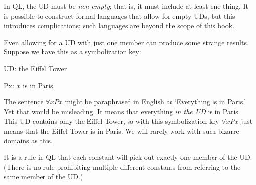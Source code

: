 In QL, the UD must be \emph{non-empty}; that is, it must include at least one thing. It is possible to construct formal languages that allow for empty UDs, but this introduces complications; such languages are beyond the scope of this book.

Even allowing for a UD with just one member can produce some strange results. Suppose we have this as a symbolization key:
\begin{ekey}
\item[UD:] the Eiffel Tower
\item[Px:] $x$ is in Paris.
\end{ekey}
The sentence $\forall x Px$ might be paraphrased in English as `Everything is in Paris.' Yet that would be misleading. It means that everything \emph{in the UD} is in Paris. This UD contains only the Eiffel Tower, so with this symbolization key $\forall x Px$ just means that the Eiffel Tower is in Paris. We will rarely work with such bizarre domains as this.

It is a rule in QL that each constant will pick out exactly one member of the UD. (There is no rule prohibiting multiple different constants from referring to the same member of the UD.)

